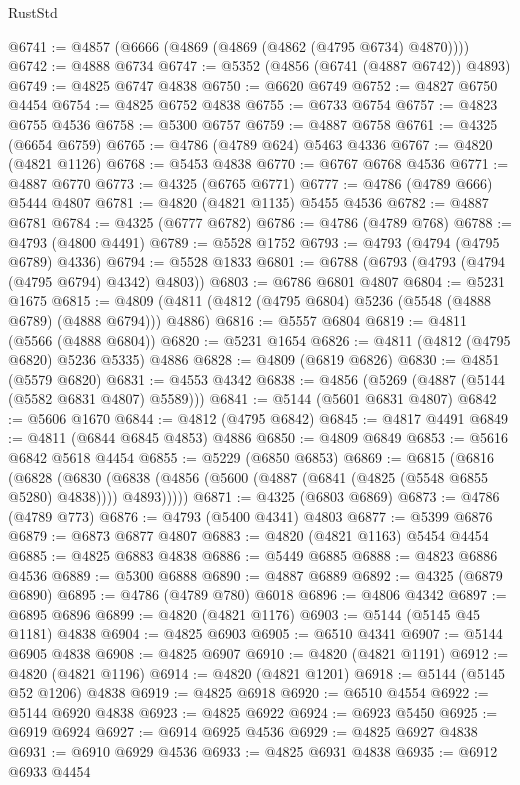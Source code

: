 \begin{lexlean}{RustStd}
\begin{coremodule}
@6741 := @4857 (@6666 (@4869 (@4869 (@4862 (@4795 @6734) @4870))))
@6742 := @4888 @6734
@6747 := @5352 (@4856 (@6741 (@4887 @6742)) @4893)
@6749 := @4825 @6747 @4838
@6750 := @6620 @6749
@6752 := @4827 @6750 @4454
@6754 := @4825 @6752 @4838
@6755 := @6733 @6754
@6757 := @4823 @6755 @4536
@6758 := @5300 @6757
@6759 := @4887 @6758
@6761 := @4325 (@6654 @6759)
@6765 := @4786 (@4789 @624) @5463 @4336
@6767 := @4820 (@4821 @1126)
@6768 := @5453 @4838
@6770 := @6767 @6768 @4536
@6771 := @4887 @6770
@6773 := @4325 (@6765 @6771)
@6777 := @4786 (@4789 @666) @5444 @4807
@6781 := @4820 (@4821 @1135) @5455 @4536
@6782 := @4887 @6781
@6784 := @4325 (@6777 @6782)
@6786 := @4786 (@4789 @768)
@6788 := @4793 (@4800 @4491)
@6789 := @5528 @1752
@6793 := @4793 (@4794 (@4795 @6789) @4336)
@6794 := @5528 @1833
@6801 := @6788 (@6793 (@4793 (@4794 (@4795 @6794) @4342) @4803))
@6803 := @6786 @6801 @4807
@6804 := @5231 @1675
@6815 := @4809 (@4811 (@4812 (@4795 @6804) @5236 (@5548 (@4888 @6789) (@4888 @6794))) @4886)
@6816 := @5557 @6804
@6819 := @4811 (@5566 (@4888 @6804))
@6820 := @5231 @1654
@6826 := @4811 (@4812 (@4795 @6820) @5236 @5335) @4886
@6828 := @4809 (@6819 @6826)
@6830 := @4851 (@5579 @6820)
@6831 := @4553 @4342
@6838 := @4856 (@5269 (@4887 (@5144 (@5582 @6831 @4807) @5589)))
@6841 := @5144 (@5601 @6831 @4807)
@6842 := @5606 @1670
@6844 := @4812 (@4795 @6842)
@6845 := @4817 @4491
@6849 := @4811 (@6844 @6845 @4853) @4886
@6850 := @4809 @6849
@6853 := @5616 @6842 @5618 @4454
@6855 := @5229 (@6850 @6853)
@6869 := @6815
    (@6816
      (@6828
        (@6830 (@6838 (@4856 (@5600 (@4887 (@6841 (@4825 (@5548 @6855 @5280) @4838)))) @4893)))))
@6871 := @4325 (@6803 @6869)
@6873 := @4786 (@4789 @773)
@6876 := @4793 (@5400 @4341) @4803
@6877 := @5399 @6876
@6879 := @6873 @6877 @4807
@6883 := @4820 (@4821 @1163) @5454 @4454
@6885 := @4825 @6883 @4838
@6886 := @5449 @6885
@6888 := @4823 @6886 @4536
@6889 := @5300 @6888
@6890 := @4887 @6889
@6892 := @4325 (@6879 @6890)
@6895 := @4786 (@4789 @780) @6018
@6896 := @4806 @4342
@6897 := @6895 @6896
@6899 := @4820 (@4821 @1176)
@6903 := @5144 (@5145 @45 @1181) @4838
@6904 := @4825 @6903
@6905 := @6510 @4341
@6907 := @5144 @6905 @4838
@6908 := @4825 @6907
@6910 := @4820 (@4821 @1191)
@6912 := @4820 (@4821 @1196)
@6914 := @4820 (@4821 @1201)
@6918 := @5144 (@5145 @52 @1206) @4838
@6919 := @4825 @6918
@6920 := @6510 @4554
@6922 := @5144 @6920 @4838
@6923 := @4825 @6922
@6924 := @6923 @5450
@6925 := @6919 @6924
@6927 := @6914 @6925 @4536
@6929 := @4825 @6927 @4838
@6931 := @6910 @6929 @4536
@6933 := @4825 @6931 @4838
@6935 := @6912 @6933 @4454

\end{coremodule}
\end{lexlean}
